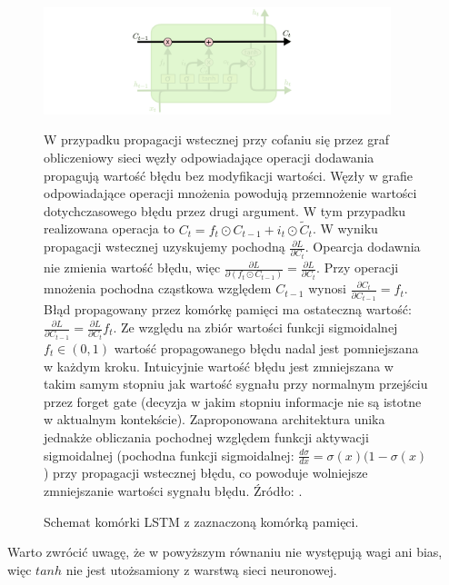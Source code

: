 \documentclass[oneside, mag]{mgr}
\begin{document}
\begin{figure}
\centering
	\includegraphics[width=0.90\textwidth]{img/LSTM3-C-line.png}
	\caption{Schemat komórki LSTM z zaznaczoną komórką pamięci.} W przypadku propagacji wstecznej przy cofaniu się przez graf obliczeniowy sieci węzły odpowiadające operacji dodawania propagują wartość błędu bez modyfikacji wartości. Węzły w grafie odpowiadające operacji mnożenia powodują przemnożenie wartości dotychczasowego błędu przez drugi argument. W tym przypadku realizowana operacja to $C_t = f_t \odot C_{t-1} + i_t \odot \tilde{C}_t$. W wyniku propagacji wstecznej uzyskujemy pochodną $\frac{\partial L}{\partial C_t}$. Opearcja dodawnia nie zmienia wartość błędu, więc $\frac{\partial L}{\partial (f_t \odot C_{t-1})} = \frac{\partial L}{\partial C_t}$. Przy operacji mnożenia pochodna cząstkowa względem $C_{t-1}$ wynosi $\frac{\partial C_t}{\partial C_{t-1}} = f_t$. Błąd propagowany przez komórkę pamięci ma ostateczną wartość: $\frac{\partial L}{\partial C_{t-1}} = \frac{\partial L}{\partial C_t} f_t$. Ze względu na zbiór wartości funkcji sigmoidalnej $f_t \in (0, 1)$ wartość propagowanego błędu nadal jest pomniejszana w każdym kroku. Intuicyjnie wartość błędu jest zmniejszana w takim samym stopniu jak wartość sygnału przy normalnym przejściu przez forget gate (decyzja w jakim stopniu informacje nie są istotne w aktualnym kontekście). Zaproponowana architektura unika jednakże obliczania pochodnej względem funkcji aktywacji sigmoidalnej (pochodna funkcji sigmoidalnej: $\frac{d \sigma}{dx} = \sigma (x)(1 - \sigma (x)$) przy propagacji wstecznej błędu, co powoduje wolniejsze zmniejszanie wartości sygnału błędu. Źródło: \cite{colah}. 
	\label{fig:lstm-mem-cell}
\end{figure}

Warto zwrócić uwagę, że w powyższym równaniu nie występują wagi ani bias, więc $tanh$ nie jest utożsamiony z warstwą sieci neuronowej.
\end{document}
